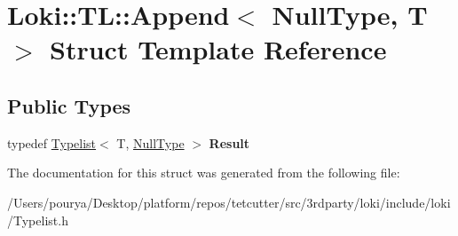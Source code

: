 \hypertarget{structLoki_1_1TL_1_1Append_3_01NullType_00_01T_01_4}{}\section{Loki\+:\+:T\+L\+:\+:Append$<$ Null\+Type, T $>$ Struct Template Reference}
\label{structLoki_1_1TL_1_1Append_3_01NullType_00_01T_01_4}
\subsection*{Public Types}
\begin{DoxyCompactItemize}
\item 
\hypertarget{structLoki_1_1TL_1_1Append_3_01NullType_00_01T_01_4_a41cf8f87626bfe554cd68fc3e281d2d9}{}typedef \hyperlink{structLoki_1_1Typelist}{Typelist}$<$ T, \hyperlink{classLoki_1_1NullType}{Null\+Type} $>$ {\bfseries Result}\label{structLoki_1_1TL_1_1Append_3_01NullType_00_01T_01_4_a41cf8f87626bfe554cd68fc3e281d2d9}

\end{DoxyCompactItemize}


The documentation for this struct was generated from the following file\+:\begin{DoxyCompactItemize}
\item 
/\+Users/pourya/\+Desktop/platform/repos/tetcutter/src/3rdparty/loki/include/loki/Typelist.\+h\end{DoxyCompactItemize}
